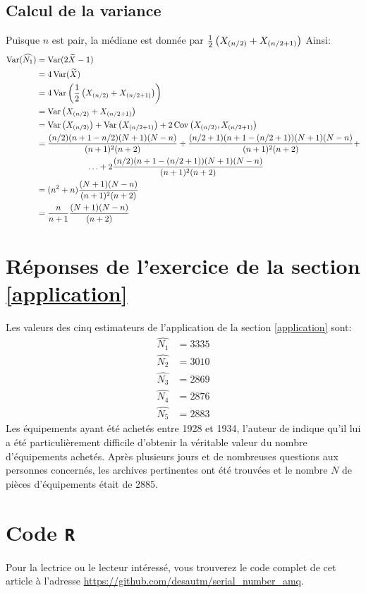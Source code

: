 \documentclass[10pt]{article}
\begin{document}
\hypertarget{calcul-de-la-variance}{%
\subsection{Calcul de la variance}\label{calcul-de-la-variance}}

Puisque \(n\) est pair, la médiane est donnée par
\(\frac{1}{2}\left(X_{\left(n/2\right)}+X_{\left(n/2+1\right)}\right)\) Ainsi: \begin{align*}
\operatorname{Var}(\widehat{N_1}) &= \operatorname{Var}(2\widetilde{X}-1) \\
&= 4\operatorname{Var}(\widetilde{X}) \\
&= 4\operatorname{Var}\left(\frac{1}{2}\left(X_{\left(n/2\right)}+X_{\left(n/2+1\right)}\right)\right) \\
&= \operatorname{Var}\left(X_{\left(n/2\right)}+X_{\left(n/2+1\right)}\right) \\
&= \operatorname{Var}\left(X_{\left(n/2\right)}\right)+\operatorname{Var}\left(X_{\left(n/2+1\right)}\right)+2\operatorname{Cov}\left(X_{\left(n/2\right)},X_{\left(n/2+1\right)}\right) \\
&= \frac{(n/2)(n+1-n/2)(N+1)(N-n)}{(n+1)^2(n+2)}+\frac{(n/2+1)(n+1-(n/2+1))(N+1)(N-n)}{(n+1)^2(n+2)}+ \\
&\qquad\qquad\qquad \ldots+2\frac{(n/2)(n+1-(n/2+1))(N+1)(N-n)}{(n+1)^2(n+2)} \\
&= (n^2+n)\frac{(N+1)(N-n)}{(n+1)^2(n+2)} \\
&= \frac{n}{n+1}\frac{(N+1)(N-n)}{(n+2)}
\end{align*}

\hypertarget{reponses-de-lexercice-de-la-section}{%
\section{\texorpdfstring{Réponses de l'exercice de la section
\ref{application}
\label{rep-application}}{Réponses de l'exercice de la section  }}\label{reponses-de-lexercice-de-la-section}}

Les valeurs des cinq estimateurs de l'application de la section
\ref{application} sont: \begin{align*}
\widehat{N_1} &= 3335 \\
\widehat{N_2} &= 3010 \\
\widehat{N_3} &= 2869 \\
\widehat{N_4} &= 2876 \\
\widehat{N_5} &= 2883
\end{align*} Les équipements ayant été achetés entre 1928 et 1934,
l'auteur de \cite{Goodman1954} indique qu'il lui a été particulièrement
difficile d'obtenir la véritable valeur du nombre d'équipements achetés.
Après plusieurs jours et de nombreuses questions aux personnes
concernés, les archives pertinentes ont été trouvées et le nombre \(N\)
de pièces d'équipements était de \(2885\).

\hypertarget{code-r}{%
\section{\texorpdfstring{Code \texttt{R}
\label{code}}{Code R }}\label{code-r}}

Pour la lectrice ou le lecteur intéressé, vous trouverez le code complet
de cet article à l'adresse
\url{https://github.com/desautm/serial_number_amq}.


\end{document}
